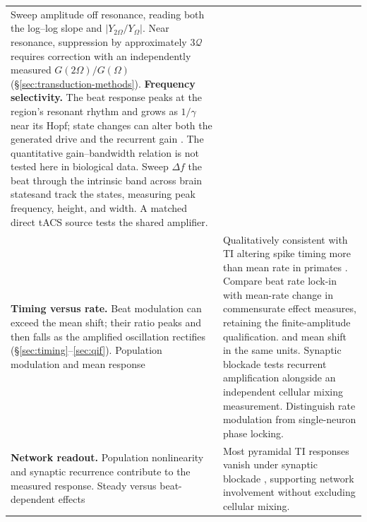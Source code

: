 \documentclass[11pt,a4paper]{article}
\providecommand{\DIFaddtex}[1]{{\protect\color{blue} \sf #1}} %
\providecommand{\DIFdeltex}[1]{{\protect\color{red} \scriptsize #1}} %
\providecommand{\DIFaddFL}[1]{\DIFadd{#1}} %
\providecommand{\DIFdelFL}[1]{\DIFdel{#1}} %
\providecommand{\DIFaddbeginFL}{} %
\providecommand{\DIFaddendFL}{} %
\providecommand{\DIFdelbeginFL}{} %
\providecommand{\DIFdelendFL}{} %
\providecommand{\DIFadd}[1]{\texorpdfstring{\DIFaddtex{#1}}{#1}} %
\providecommand{\DIFdel}[1]{\texorpdfstring{\DIFdeltex{#1}}{}} %
\begin{document}
\begin{table}[htbp]
\begin{tabular}{@{}>{\raggedright\arraybackslash}p{}
 >{\raggedright\arraybackslash}p{}@{}}
{extracellular field rather than $\varepsilon$.
}%
\DIFdelFL{Sweep amplitude off resonance, reading both the log--log slope and
$|Y_{2\Omega}/Y_\Omega|$. Near resonance, suppression by approximately
$3\mathcal Q$ requires correction with an independently measured
$G(2\Omega)/G(\Omega)$ (\S\ref{sec:transduction-methods}). }%
\DIFdelFL{\textbf{Frequency selectivity.} The beat response peaks at the region's resonant
rhythm and grows as $1/\gamma$ near its Hopf; state changes can alter both the
generated drive and the recurrent gain \cite{ruffini2025cfc}.
}%
\DIFdelFL{The quantitative gain--bandwidth relation is not tested here in biological data.
}%
\DIFdelendFL Sweep \DIFdelbeginFL \DIFdelFL{$\Delta f$ }\DIFdelendFL \DIFaddbeginFL \DIFaddFL{the beat }\DIFaddendFL through the intrinsic band across
\DIFdelbeginFL \DIFdelFL{brain statesand track the
}\DIFdelendFL \DIFaddbeginFL \DIFaddFL{states, measuring }\DIFaddendFL peak frequency, height, and width. \DIFaddbeginFL \DIFaddFL{A matched direct tACS
source tests the shared amplifier. }\DIFaddendFL \\[4pt]
\DIFdelbeginFL \DIFdelFL{\textbf{Timing versus rate.} Beat modulation can exceed the mean shift; their ratio
peaks and then falls as the amplified oscillation rectifies
(\S\ref{sec:timing}--\ref{sec:qif}).
}\DIFdelendFL \DIFaddbeginFL \DIFaddFL{Population modulation and mean response }\DIFaddendFL & \DIFdelbeginFL \DIFdelFL{Qualitatively consistent with TI altering spike timing more than mean rate in
primates \cite{vieira2024}.
}%
\DIFdelendFL Compare \DIFdelbeginFL \DIFdelFL{beat }\DIFdelendFL \DIFaddbeginFL \DIFaddFL{rate }\DIFaddendFL lock-in \DIFdelbeginFL \DIFdelFL{with mean-rate change in commensurate effect measures,
retaining the finite-amplitude qualification. }\DIFdelendFL \DIFaddbeginFL \DIFaddFL{and mean shift
in the same units. Synaptic blockade tests recurrent amplification alongside
an independent cellular mixing measurement. Distinguish rate modulation from
single-neuron phase locking. }\DIFaddendFL \\[4pt]
\DIFdelbeginFL \DIFdelFL{\textbf{Network readout.} Population nonlinearity and synaptic recurrence contribute
to the measured response.
}\DIFdelendFL \DIFaddbeginFL \DIFaddFL{Steady versus beat-dependent effects }\DIFaddendFL & \DIFdelbeginFL \DIFdelFL{Most pyramidal TI responses vanish under synaptic blockade \cite{caldas2024},
supporting network involvement without excluding cellular mixing.
}
\end{tabular}
\end{table}
\end{document}
